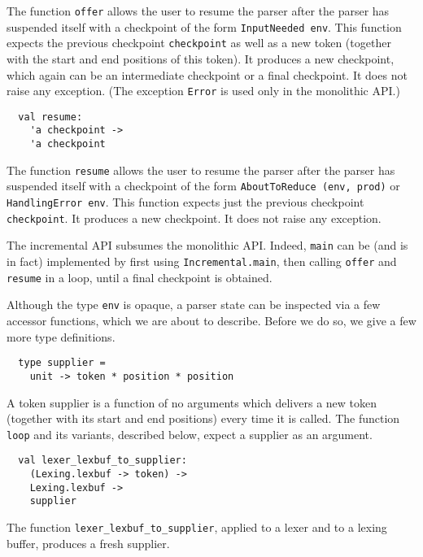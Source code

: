 \documentclass[onecolumn,11pt,nocopyrightspace,preprint]{sigplanconf}
\begin{document}
The function \verb+offer+ allows the user to resume the parser after the
parser has suspended itself with a checkpoint of the form \verb+InputNeeded env+.
This function expects the previous checkpoint \verb+checkpoint+ as well as a new token
(together with the start and end positions of this token). It produces a new
checkpoint, which again can be an intermediate checkpoint or a final checkpoint. It does
not raise any exception. (The exception \texttt{Error} is used only in the
monolithic API.)


\begin{verbatim}
  val resume:
    'a checkpoint ->
    'a checkpoint
\end{verbatim}

The function \verb+resume+ allows the user to resume the parser after the
parser has suspended itself with a checkpoint of the form
\verb+AboutToReduce (env, prod)+ or \verb+HandlingError env+.
This function expects just the previous checkpoint \verb+checkpoint+. It produces a new
checkpoint. It does not raise any exception.

The incremental API subsumes the monolithic API. Indeed, \verb+main+ can be
(and is in fact) implemented by first using
\verb+Incremental.main+, then calling \verb+offer+ and
\verb+resume+ in a loop, until a final checkpoint is obtained.

Although the type \verb+env+ is opaque, a parser state can be inspected via a
few accessor functions, which we are about to describe. Before we do so, we
give a few more type definitions.


\begin{verbatim}
  type supplier =
    unit -> token * position * position
\end{verbatim}

A token supplier is a function of no arguments which delivers a new token
(together with its start and end positions) every time it is called. The
function \verb+loop+ and its variants, described below, expect a supplier
as an argument.


\begin{verbatim}
  val lexer_lexbuf_to_supplier:
    (Lexing.lexbuf -> token) ->
    Lexing.lexbuf ->
    supplier
\end{verbatim}

The function \verb+lexer_lexbuf_to_supplier+, applied to a lexer and to a
lexing buffer, produces a fresh supplier.
\end{document}
